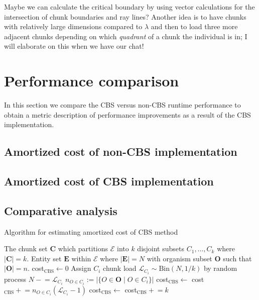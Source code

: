 \documentclass[a4paper, 12pt]{report}
\theoremstyle{definition}
\begin{document}
\par Maybe we can calculate the critical boundary by using vector calculations for the intersection of chunk boundaries and ray lines?
Another idea is to have chunks with relatively large dimensions compared to $\lambda$ and then to load three more adjacent chunks depending on
which \emph{quadrant} of a chunk the individual is in; I will elaborate on this when we have our chat!

\section{Performance comparison}
In this section we compare the CBS versus non-CBS runtime performance to obtain a metric description
of performance improvements as a result of the CBS implementation.

\subsection{Amortized cost of non-CBS implementation}

\subsection{Amortized cost of CBS implementation}

\subsection{Comparative analysis}
\begin{algorithm}[ht!]
    \caption{Algorithm for estimating amortized cost of CBS method}
    \begin{algorithmic}[1]
        \Require The chunk set $\mathbf C$ which partitions $\mathscr E$ into $k$ disjoint
        subsets $C_1, \ldots, C_k$ where $|\mathbf C| = k$. Entity set $\mathbf E$ within $\mathscr E$
        where $|\mathbf E| = N$ with organism subset $\mathbf O$ such that $|\mathbf O| = n$.
        \State cost$_{\text{CBS}} \leftarrow 0$ 
            \State Assign $C_i$ chunk load $\mathcal L_{C_i} \sim \text{Bin}(N, 1/k)$ by random process
            \State $N \mathrel{-}= \mathcal L_{C_i}$ 
            \State $n_{O \in C_i} := |\{O \in \mathbf O \mid O \in C_i\}|$ 
            \State cost$_{\text{CBS}} \leftarrow$ cost$_{\text{CBS}} \mathrel{+}= n_{O \in C_i} (\mathcal L_{C_i} - 1)$
        \EndFor
        \State cost$_{\text{CBS}} \leftarrow$ cost$_{\text{CBS}} \mathrel{+}= k$
        \EndProcedure
    \end{algorithmic}
    \label{cbs-costmodel}
\end{algorithm}
\end{document}
